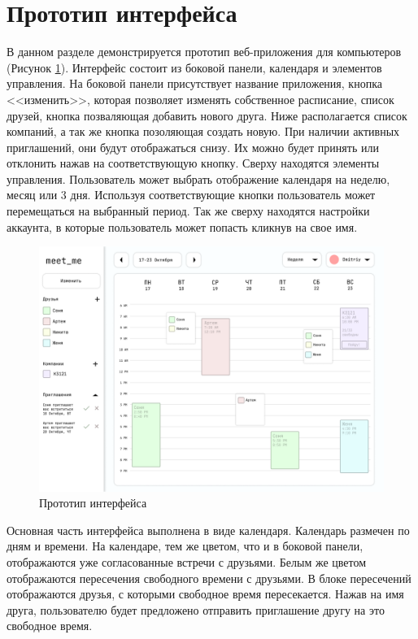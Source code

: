 \documentclass[14pt]{extreport}
\begin{document}
\section{Прототип интерфейса}
В данном разделе демонстрируется прототип веб-приложения для компьютеров (Рисунок \ref{fig:prototype}). Интерфейс состоит из боковой панели, календаря и элементов управления. На боковой панели присутствует название приложения, кнопка <<изменить>>, которая позволяет изменять собственное расписание, список друзей, кнопка позваляющая добавить нового друга. Ниже располагается список компаний, а так же кнопка позоляющая создать новую. При наличии активных приглашений, они будут отображаться снизу. Их можно будет принять или отклонить нажав на соответствующую кнопку.
Сверху находятся элементы управления. Пользователь может выбрать отображение календаря на неделю, месяц или 3 дня. Используя соответствующие кнопки пользователь может перемещаться на выбранный период. Так же сверху находятся настройки аккаунта, в которые пользователь может попасть кликнув на свое имя.
\begin{figure}[h]   
    \centering
    \includegraphics[width=0.9\linewidth]{prototype.png}
    \caption{ Прототип интерфейса}
    \label{fig:prototype}
\end{figure}

Основная часть интерфейса выполнена в виде календаря. Календарь размечен по дням и времени.
На календаре, тем же цветом, что и в боковой панели, отображаются уже согласованные встречи с друзьями. Белым же цветом отображаются пересечения свободного времени с друзьями. В блоке пересечений отображаются друзья, с которыми свободное время пересекается.
Нажав на имя друга, пользователю будет предложено отправить приглашение другу на это свободное время.
\end{document}
